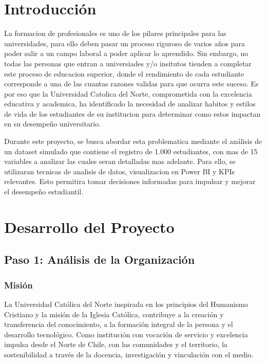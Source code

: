\documentclass[12pt,letterpaper]{report}
\begin{document}
\chapter*{Introducción}

La formacion de profesionales es uno de los pilares principales para las universidades, para ello deben pasar un proceso riguroso de varios años para poder salir a un campo laboral a poder aplicar lo aprendido. Sin embargo, no todas las personas que entran a universiades y/o insitutos tienden a completar este proceso de educacion superior, donde el rendimiento de cada estudiante corresponde a una de las cuantas razones validas para que ocurra este suceso. Es por eso que la Universidad Catolica del Norte, comprometida con la excelencia educativa y academica, ha identificado la necesidad de analizar habitos y estilos de vida de los estudiantes de su institucion para determinar como estos impactan en su desempeño universitario.

Durante este proyecto, se busca abordar esta problematica mediante el análisis de un dataset simulado que contiene el registro de 1.000 estudiantes, con mas de 15 variables a analizar las cuales seran detalladas mas adelante. Para ello, se utilizaran tecnicas de analisis de datos, visualizacion en Power BI y KPIs relevantes. Esto permitira tomar decisiones informadas para impulsar y mejorar el desempeño estudiantil.

\newpage

\chapter{Desarrollo del Proyecto}

\section{Paso 1: Análisis de la Organización}

\subsection{Misión}
La Universidad Católica del Norte inspirada en los principios del Humanismo Cristiano y la misión de la Iglesia Católica, contribuye a la creación y transferencia del conocimiento, a la formación integral de la persona y el desarrollo tecnológico. Como institución con vocación de servicio y excelencia impulsa desde el Norte de Chile, con las comunidades y el territorio, la sostenibilidad a través de la docencia, investigación y vinculación con el medio.
\end{document}
